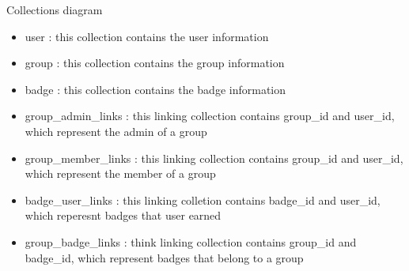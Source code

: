 Collections diagram

\begin{itemize}
\item user : this collection contains the user information
\item group : this collection contains the group information  
\item badge : this collection contains the badge information
\item group{\_}admin{\_}links : this linking collection contains group{\_}id and user{\_}id, which represent the admin of a group
\item group{\_}member{\_}links : this linking collection contains group{\_}id and user{\_}id, which represent the member of a group
\item badge{\_}user{\_}links : this linking colletion contains badge{\_}id and user{\_}id, which reperesnt badges that user earned
\item group{\_}badge{\_}links : think linking collection contains group{\_}id and badge{\_}id, which represent badges that belong to a group
\end{itemize}




